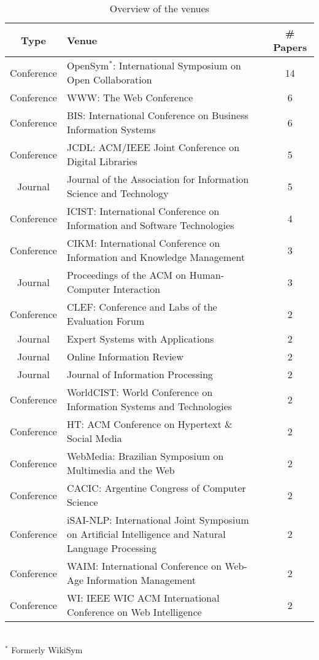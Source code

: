 \begin{table}[htbp]
    \caption{Overview of the venues}
    \label{tab:venues}
    \centering
    \begin{tabular}{c m{} c}
        \toprule
        \textbf{Type} & \textbf{Venue} & \textbf{\# Papers} \\
        \midrule
        Conference & OpenSym$^*$: International Symposium on Open Collaboration & 14 \\
        Conference & WWW: The Web Conference & 6 \\
        Conference & BIS: International Conference on Business Information Systems & 6 \\
        Conference & JCDL: ACM/IEEE Joint Conference on Digital Libraries & 5 \\
        Journal & Journal of the Association for Information Science and Technology & 5 \\
        Conference & ICIST: International Conference on Information and Software Technologies & 4 \\
        Conference & CIKM: International Conference on Information and Knowledge Management & 3 \\
        Journal & Proceedings of the ACM on Human-Computer Interaction & 3 \\
        Conference & CLEF: Conference and Labs of the Evaluation Forum & 2 \\
        Journal & Expert Systems with Applications & 2 \\
        Journal & Online Information Review & 2 \\
        Journal & Journal of Information Processing & 2 \\
        Conference & WorldCIST: World Conference on Information Systems and Technologies & 2 \\
        Conference & HT: ACM Conference on Hypertext \& Social Media & 2 \\
        Conference & WebMedia: Brazilian Symposium on Multimedia and the Web & 2 \\
        Conference & CACIC: Argentine Congress of Computer Science & 2 \\
        Conference & iSAI-NLP: International Joint Symposium on Artificial Intelligence and Natural Language Processing & 2 \\
        Conference & WAIM: International Conference on Web-Age Information Management & 2 \\
        Conference & WI: IEEE WIC ACM International Conference on Web Intelligence & 2 \\
        \bottomrule
    \end{tabular}
    \\ \vspace{0.1cm}
    \footnotesize
    $^*$ Formerly WikiSym
\end{table}

